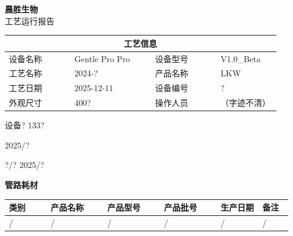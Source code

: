 \documentclass[UTF8,10pt,a4paper,fontset=fandol]{ctexart}
\newcommand{\fieldvalue}[1]{#1}
\newcommand{\handwritten}[1]{#1}
\begin{document}
\begin{minipage}[t]{0.47\linewidth}
\centering
\textbf{晨胜生物}\\
工艺运行报告

\smallskip
\begin{tabular}{|p{0.22\linewidth}|p{0.27\linewidth}|p{0.22\linewidth}|p{0.20\linewidth}|}
\hline
\multicolumn{4}{c}{\textbf{工艺信息}}\\
\hline
设备名称 &
\fieldvalue{Gentle Pro Pro} &
设备型号 &
\fieldvalue{V1.0\_Beta}\\
\hline
工艺名称 &
\fieldvalue{2024-?} &
产品名称 &
\fieldvalue{LKW}\\
\hline
工艺日期 &
\fieldvalue{2025-12-11} &
设备编号 &
\fieldvalue{?}\\
\hline
外观尺寸 &
\fieldvalue{400\times ?} &
操作人员 &
\fieldvalue{\handwritten{（字迹不清）}}\\
\hline
\end{tabular}

\handwritten{设备? 133?}

\handwritten{2025/?}

\handwritten{?/? 2025/?}

\smallskip
\textbf{管路耗材}

\begin{tabular}{|p{0.14\linewidth}|p{0.19\linewidth}|p{0.19\linewidth}|p{0.19\linewidth}|p{0.14\linewidth}|p{0.10\linewidth}|}
\hline
类别&产品名称&产品型号&产品批号&生产日期&备注\\
\hline
\fieldvalue{/}&
\fieldvalue{/}&
\fieldvalue{/}&
\fieldvalue{/}&
\fieldvalue{/}&
\fieldvalue{/}\\
\hline
\end{tabular}


\end{minipage}
\end{document}
